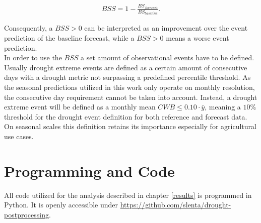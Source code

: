 \documentclass[ba-lentz.tex]{subfile}
\begin{document}
\begin{align}
    BSS = 1 - \frac{BS_{forecast}}{BS_{baseline}} . \label{bss}
\end{align}

Consequently, a $BSS > 0$ can be interpreted as an improvement over the event prediction of the baseline forecast, while a $BSS > 0$ means a worse event prediction. \\
In order to use the $BSS$ a set amount of observational events have to be defined.
Usually drought extreme events are defined as a certain amount of consecutive days with a drought metric not surpassing a predefined percentile threshold.
As the seasonal predictions utilized in this work only operate on monthly resolution, the consecutive day requirement cannot be taken into account.
Instead, a drought extreme event will be defined as a monthly mean $CWB \leq 0.10 \cdot \bar{y}$, meaning a $10 \%$ threshold for the drought event definition for both reference and forecast data.
On seasonal scales this definition retains its importance especially for agricultural use cases.

\section{Programming and Code}

All code utilized for the analysis described in chapter \ref{results} is programmed in Python. It is openly accessible under \url{https://github.com/slenta/drought-postprocessing}.
\end{document}

